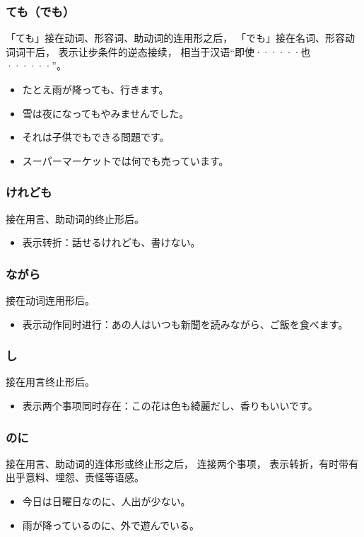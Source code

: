 \subsubsection{ても（でも）}%

「ても」接在动词、形容词、助动词的连用形之后，
「でも」接在名词、形容动词词干后，
表示让步条件的逆态接续，
相当于汉语``即使······也······''。
\begin{itemize}
  \item たとえ雨が降っても、行きます。
  \item 雪は夜になってもやみませんでした。
  \item それは子供でもできる問題です。
  \item スーパーマーケットでは何でも売っています。
\end{itemize}


\subsubsection{けれども}%

接在用言、助动词的终止形后。
\begin{itemize}
  \item 表示转折：話せるけれども、書けない。
\end{itemize}


\subsubsection{ながら}%

接在动词连用形后。
\begin{itemize}
  \item 表示动作同时进行：あの人はいつも新聞を読みながら、ご飯を食べます。
\end{itemize}


\subsubsection{し}%

接在用言终止形后。
\begin{itemize}
  \item 表示两个事项同时存在：この花は色も綺麗だし、香りもいいです。
\end{itemize}


\subsubsection{のに}%

接在用言、助动词的连体形或终止形之后，
连接两个事项，
表示转折，有时带有出乎意料、埋怨、责怪等语感。
\begin{itemize}
  \item 今日は日曜日なのに、人出が少ない。
  \item 雨が降っているのに、外で遊んでいる。
\end{itemize}

